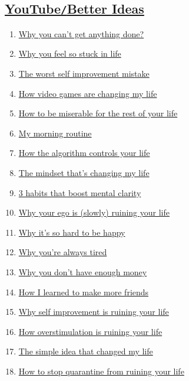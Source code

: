 \documentclass{article}
\begin{document}
\subsection{\href{https://www.youtube.com/channel/UCtUId5WFnN82GdDy7DgaQ7w}{YouTube{\tt/}Better Ideas}}
\begin{enumerate}
	\item \href{https://www.youtube.com/watch?v=EQf8w8Ed5k0}{Why you can't get anything done?}
	\item \href{https://www.youtube.com/watch?v=I0biBk4Y8Qg}{Why you feel so stuck in life}
	\item \href{https://www.youtube.com/watch?v=wLzteVkyReA}{The worst self improvement mistake}
	\item \href{https://www.youtube.com/watch?v=Rim2rXIbVoA}{How video games are changing my life}
	\item \href{https://www.youtube.com/watch?v=W9qsxhhNUoU}{How to be miserable for the rest of your life}
	\item \href{https://www.youtube.com/watch?v=akRLUpQp5xo}{My morning routine}
	\item \href{https://www.youtube.com/watch?v=8XO53urLcvY}{How the algorithm controls your life}
	\item \href{https://www.youtube.com/watch?v=B-L8CYwglj4}{The mindset that's changing my life}
	\item \href{https://www.youtube.com/watch?v=DbxPgd9DKEY}{3 habits that boost mental clarity}
	\item \href{https://www.youtube.com/watch?v=HHCifdfI47M}{Why your ego is (slowly) ruining your life}
	\item \href{https://www.youtube.com/watch?v=rQoS_S9K464}{Why it's so hard to be happy}
	\item \href{https://www.youtube.com/watch?v=js2vfr96iAQ}{Why you're always tired}
	\item \href{https://www.youtube.com/watch?v=SHFAZv8PR_c}{Why you don't have enough money}
	\item \href{https://www.youtube.com/watch?v=nm7OMGjbCgc}{How I learned to make more friends}
	\item \href{https://www.youtube.com/watch?v=DEz7oJy37lI}{Why self improvement is ruining your life}
	\item \href{https://www.youtube.com/watch?v=yYWvUoN4yt8}{How overstimulation is ruining your life}
	\item \href{https://www.youtube.com/watch?v=6U06IfrhN6k}{The simple idea that changed my life}
	\item \href{https://www.youtube.com/watch?v=b8SRAKfP2J4}{How to stop quarantine from ruining your life}

\end{enumerate}
\end{document}
